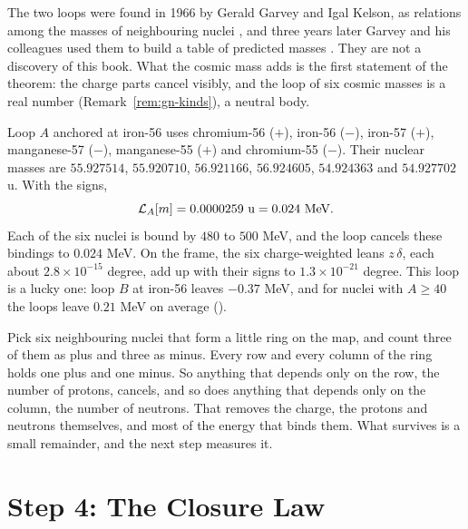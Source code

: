 The two loops were found in 1966 by Gerald Garvey and Igal Kelson, as relations among the masses of neighbouring nuclei \citep{GarveyKelson1966}, and three years later Garvey and his colleagues used them to build a table of predicted masses \citep{Garvey1969}. They are not a discovery of this book. What the cosmic mass adds is the first statement of the theorem: the charge parts cancel visibly, and the loop of six cosmic masses is a real number (Remark~\ref{rem:gn-kinds}), a neutral body.

\begin{workedexample}
Loop $A$ anchored at iron-56 uses chromium-56 ($+$), iron-56 ($-$), iron-57 ($+$), manganese-57 ($-$), manganese-55 ($+$) and chromium-55 ($-$). Their nuclear masses are $55.927514$, $55.920710$, $56.921166$, $56.924605$, $54.924363$ and $54.927702$ u. With the signs,
\[
\Lop_A[m] = 0.0000259\ \text{u} = 0.024\ \text{MeV}.
\]
Each of the six nuclei is bound by $480$ to $500$ MeV, and the loop cancels these bindings to $0.024$ MeV. On the frame, the six charge-weighted leans $z\,\delta$, each about $2.8 \times 10^{-15}$ degree, add up with their signs to $1.3 \times 10^{-21}$ degree. This loop is a lucky one: loop $B$ at iron-56 leaves $-0.37$ MeV, and for nuclei with $A \ge 40$ the loops leave $0.21$ MeV on average ().
\end{workedexample}

\begin{plainwords}
Pick six neighbouring nuclei that form a little ring on the map, and count three of them as plus and three as minus. Every row and every column of the ring holds one plus and one minus. So anything that depends only on the row, the number of protons, cancels, and so does anything that depends only on the column, the number of neutrons. That removes the charge, the protons and neutrons themselves, and most of the energy that binds them. What survives is a small remainder, and the next step measures it.
\end{plainwords}

\section{Step 4: The Closure Law}\label{sec:cl-law}

